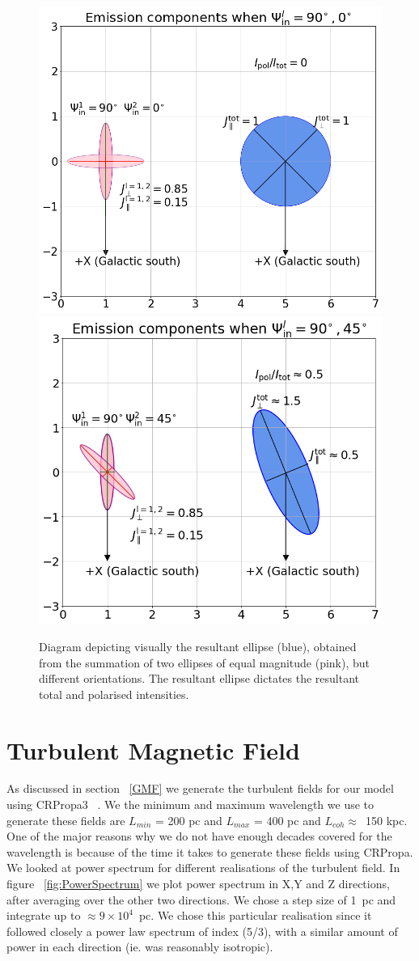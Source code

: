 \documentclass[usenatbib]{mnras}
\begin{document}
\begin{figure}
\centering
\includegraphics[width = 0.49\linewidth]{Images/Total_intensity_Ellipses_circles_emissions.png}
\label{fig_tot_intensity}
\includegraphics[width = 0.49\linewidth]{Images/Pol_intensity_Ellipses_circles_emissions.png}
\label{fig_pol_intensity}
\caption{Diagram depicting visually the resultant ellipse (blue), obtained from the summation of two ellipses of equal magnitude (pink), but different orientations. The resultant ellipse dictates the resultant total and polarised intensities.}
\end{figure}


\section{Turbulent Magnetic Field}
\label{Appendix_B}
As discussed in section ~\ref{GMF} we generate the turbulent fields for our model using CRPropa3 ~\cite{CRPropa3_2016}. We the minimum and maximum wavelength we use to generate these fields are 
$L_{min}$ = 200 pc and $L_{max}$ = 400 pc and $L_{coh} \approx $~150 kpc. One of the major reasons why we do not have enough decades covered for the wavelength is because of the time it takes to generate these fields using CRPropa. 
We looked at power spectrum for different realisations of the turbulent field. In figure ~\ref{fig:PowerSpectrum} we plot power spectrum in X,Y and Z directions, after averaging over the other two directions. We chose a step size of 1~pc and integrate up to $\approx 9\times10^4$~pc. We chose this particular realisation since it followed closely a power law spectrum of index (5/3), with a similar amount of power in each direction (ie. was reasonably isotropic). 
\end{document}
